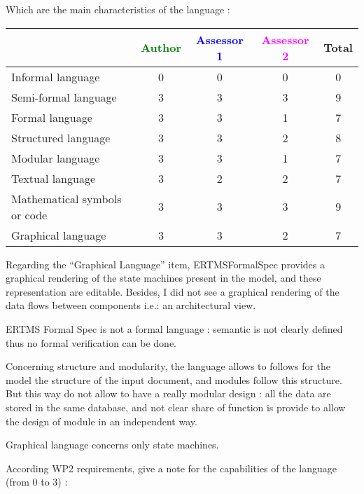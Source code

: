 Which are the main characteristics of the language :

\begin{tabular}{|l | c | c | c | c|}
\hline
& \textcolor{green}{Author} & \textcolor{blue}{Assessor 1} & \textcolor{magenta}{Assessor 2} & Total \\
\hline 
Informal language & 0 & 0 & 0 & 0 \\
\hline 
Semi-formal language & 3 & 3 & 3 & 9 \\
\hline
Formal language & 3 & 3 & 1 & 7 \\
\hline
Structured language & 3 & 3 & 2 & 8 \\
\hline 
Modular language & 3 & 3 & 1 & 7 \\
\hline
Textual language & 3 & 2 & 2 & 7 \\
\hline
Mathematical symbols or code & 3 & 3 & 3 & 9 \\
\hline
Graphical language & 3 & 3 & 2 & 7 \\
\hline
\end{tabular}

\begin{assessor1}
Regarding the "`Graphical Language"' item, ERTMSFormalSpec provides a graphical rendering of the state machines present in the model, and these representation are editable. Besides, I did not see a graphical rendering of the data flows between components i.e.: an architectural view. 
\end{assessor1}


\begin{assessor2}
ERTMS Formal Spec is not a formal language :  semantic is not clearly defined thus no formal verification can be done.

Concerning structure and modularity, the language allows to follows for the model the structure of the input document, and modules follow this structure. But this way do not allow to have a really modular design :  all the data are stored in the same database, and not clear share of function is provide to allow the design of module in an independent way.

Graphical language concerns only state machines.
\end{assessor2}

According WP2 requirements, give a note for the capabilities of the language (from 0 to 3) :

